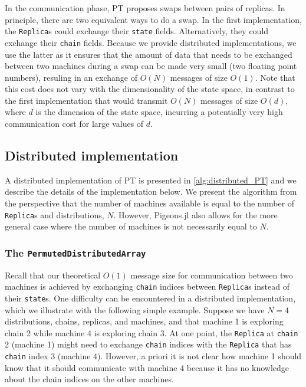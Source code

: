 \medskip 
In the communication phase, PT proposes swaps between pairs of replicas. 
In principle, there are two equivalent ways to do a swap.
In the first implementation, the \texttt{Replica}s 
could exchange their \texttt{state} fields.
Alternatively, they could exchange their \texttt{chain} fields.
Because we provide distributed implementations, we use the latter as it ensures that 
the amount of data that needs to be exchanged between two machines during a swap 
can be made very small (two floating point numbers), resuling in 
an exchange of $O(N)$ messages of size $O(1)$. 
Note that this cost does not vary with the dimensionality of the state space, 
in contrast to the first implementation that would transmit 
$O(N)$ messages of size $O(d)$, where $d$ is the dimension of the state space,
incurring a potentially very high communication cost for large values of $d$.


\subsection{Distributed implementation}
A distributed implementation of PT is presented in \cref{alg:distributed_PT}
and we describe the details of the implementation below.
We present the algorithm from the perspective that the number of machines available 
is equal to the number of \texttt{Replica}s and distributions, $N$. 
However, Pigeons.jl also allows for the more general case where the number of 
machines is not necessarily equal to $N$.

\subsubsection{The \texttt{PermutedDistributedArray}}
\label{sec:permuted_dist_array}
Recall that our theoretical $O(1)$ message size for communication between two machines 
is achieved by exchanging \texttt{chain} indices between \texttt{Replica}s 
instead of their \texttt{state}s.
One difficulty can be encountered in a distributed implementation, which we 
illustrate with the following simple example. 
Suppose we have $N=4$ distributions, chains, replicas, and machines, and that 
machine 1 is exploring chain 2 while machine 4 is exploring chain 3.
At one point, the \texttt{Replica} at \texttt{chain} 2 (machine 1) might need to exchange
\texttt{chain} indices with the \texttt{Replica} that has \texttt{chain} index 3 (machine 4). 
However, a priori it is not clear how machine 1 should know that it should communicate 
with machine 4 because it has no knowledge about the chain indices on the other machines.

